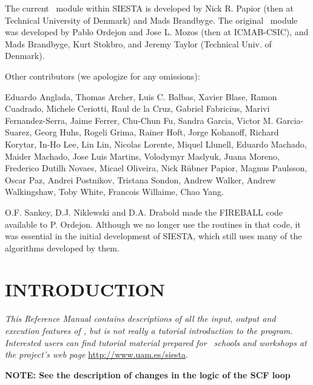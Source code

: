 The current \tsiesta\ module within SIESTA is developed by 
Nick R. Papior (then at Technical University of Denmark) and Mads Brandbyge. 
The original \tsiesta\ module was developed by
Pablo Ordejon and Jose L. Mozos (then at ICMAB-CSIC), and Mads Brandbyge,
Kurt Stokbro, and Jeremy Taylor (Technical Univ. of Denmark).

Other contributors (we apologize for any omissions):

Eduardo Anglada,
Thomas Archer,
Luis C. Balbas,
Xavier Blase,
Ramon Cuadrado,
Michele Ceriotti,
Raul de la Cruz,
Gabriel Fabricius,
Marivi Fernandez-Serra,
Jaime Ferrer,
Chu-Chun Fu,
Sandra Garcia,
Victor M. Garcia-Suarez,
Georg Huhs,
Rogeli Grima,
Rainer Hoft,
Jorge Kohanoff,
Richard Korytar,
In-Ho Lee,
Lin Lin,
Nicolas Lorente,
Miquel Llunell,
Eduardo Machado,
Maider Machado,
Jose Luis Martins,
Volodymyr Maslyuk,
Juana Moreno,
Frederico Dutilh Novaes, 
Micael Oliveira,
Nick R\"ubner Papior,
Magnus Paulsson,
Oscar Paz,
Andrei Postnikov,
Tristana Sondon,
Andrew Walker,
Andrew Walkingshaw,
Toby White,
Francois Willaime,
Chao Yang.

O.F. Sankey, D.J. Niklewski and D.A. Drabold made the FIREBALL code
available to P. Ordejon.  Although we no longer use the routines in
that code, it was essential in the initial development of SIESTA,
which still uses many of the algorithms developed by them.

\tableofcontents

\newpage

\section{INTRODUCTION}

\textit{This Reference Manual contains descriptions of all the input,
  output and execution features of \siesta, but is not really a
  tutorial introduction to the program. Interested users can find
  tutorial material prepared for \siesta\ schools and workshops at
  the project's web page} \url{http://www.uam.es/siesta}.


\textbf{NOTE: See the description of changes in the logic of the SCF loop}


